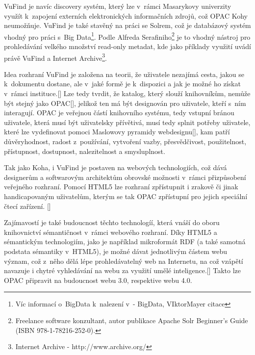 \documentclass[
	11pt, oneside, printed, draft, 
	table,   %
	lof,     %
	lot     %
]{fithesis3}
\newcommand{\citepages}[2]{[\cite[#1]{#2}]}
\begin{document}
{VuFind je navíc discovery systém, který lze v~rámci Masarykovy univerzity využít k~zapojení externích elektronických informačních zdrojů, což OPAC Kohy neumožňuje. VuFind je také stavěný na práci se Solrem, což je databázový systém vhodný pro práci s~Big Data\footnote{Víc informací o~BigData k~nalezení v~- BigData, VIktorMayer citace
}. Podle Alfreda Serafiniho\footnote{Freelance software konzultant, autor publikace Apache Solr Beginner's Guide (ISBN 978-1-78216-252-0).} je to vhodný nástroj pro prohledávání velkého množství read-only metadat, kde jako příklady využití uvádí právě VuFind a Internet Archive\footnote{Internet Archive - http://www.archive.org/}. %


Idea rozhraní VuFind je založena na teorii, že uživatele nezajímá cesta, jakou se k~dokumentu dostane, ale v~jaké formě je k~dispozici a jak je možné ho získat v~rámci instituce.\citepages{20}{Coufalova2009} Lze tedy tvrdit, že katalog, který slouží knihovníkům, nemůže být stejný jako OPAC\citepages{5}{Schmidt2012}, jelikož ten má být designován pro uživatele, kteří s~ním interagují. OPAC je veřejnou částí knihovního systému, tedy vstupní bránou uživatele, která musí být uživatelsky přívětivá, musí tedy splnit potřeby uživatele, které lze vydefinovat pomoci Maslowovy pyramidy webdesignu\citepages{156-179}{rezac_2014}, kam patří důvěryhodnost, radost z~používání, vytvoření vazby, přesvědčivost, použitelnost, přístupnost, dostupnost, nalezitelnost a smysluplnost. 

Tak jako Koha, i VuFind je postaven na webových technologiích, což dává designerům a softwarovým architektům obrovské možnosti v~rámci přizpůsobení veřejného rozhraní. Pomocí HTML5 lze rozhraní zpřístupnit i zrakově či jinak handicapovaným uživatelům, kterým se tak OPAC zpřístupní pro jejich speciální čtecí zařízení. \citepages{19-27}{Hogan2011}

Zajímavostí je také budoucnost těchto technologíí, která vnáší do oboru knihovnictví sémantičnost v~rámci webového rozhraní. Díky HTML5 a sémantickým technologiím, jako je například mikroformát RDF (a také samotná podstata sémantiky v~HTML5), je možné dávat jednotlivým částem webu význam, což z~něho dělá lépe prohledávatelný web na Internetu, na což vzápětí navazuje i chytré vyhledávání na webu za využití umělé inteligence.\citepages{70-77}{fay_sauers_2012} Takto lze OPAC připravit na budoucnost webu 3.0, respektive webu 4.0.

}
\end{document}
